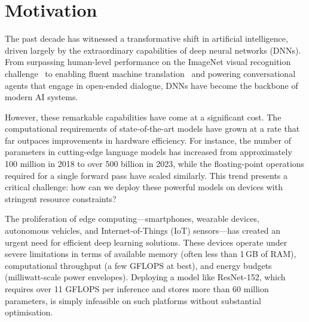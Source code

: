 \section{Motivation}

The past decade has witnessed a transformative shift in artificial
intelligence, driven largely by the extraordinary capabilities of deep
neural networks (DNNs). From surpassing human-level performance on the
ImageNet visual recognition challenge~\cite{he2016deep} to enabling
fluent machine translation~\cite{vaswani2017attention} and powering
conversational agents that engage in open-ended dialogue, DNNs have
become the backbone of modern AI systems.

However, these remarkable capabilities have come at a significant
cost. The computational requirements of state-of-the-art models have
grown at a rate that far outpaces improvements in hardware
efficiency. For instance, the number of parameters in cutting-edge
language models has increased from approximately 100 million in 2018 to
over 500 billion in 2023, while the floating-point operations required
for a single forward pass have scaled similarly. This trend presents a
critical challenge: how can we deploy these powerful models on devices
with stringent resource constraints?

The proliferation of edge computing---smartphones, wearable devices,
autonomous vehicles, and Internet-of-Things (IoT) sensors---has created
an urgent need for efficient deep learning solutions. These devices
operate under severe limitations in terms of available memory (often
less than 1\,GB of RAM), computational throughput (a few GFLOPS at
best), and energy budgets (milliwatt-scale power envelopes). Deploying
a model like ResNet-152, which requires over 11 GFLOPS per inference and
stores more than 60 million parameters, is simply infeasible on such
platforms without substantial optimisation.

